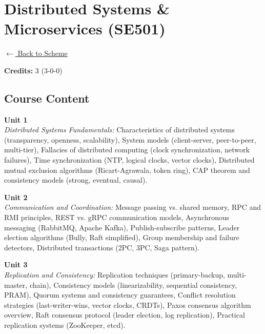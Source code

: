\section*{Distributed Systems \& Microservices (SE501)}
\label{major:SE_5}

\noindent \small{\hyperref[main:scheme]{$\leftarrow$ Back to Scheme}} \vspace{0.5cm}

\noindent \textbf{Credits:} 3 (3-0-0)

\subsection*{Course Content}
\noindent\textbf{Unit 1} \\
\textit{Distributed Systems Fundamentals:} Characteristics of distributed systems (transparency, openness, scalability), System models (client-server, peer-to-peer, multi-tier), Fallacies of distributed computing (clock synchronization, network failures), Time synchronization (NTP, logical clocks, vector clocks), Distributed mutual exclusion algorithms (Ricart-Agrawala, token ring), CAP theorem and consistency models (strong, eventual, causal).

\vspace{0.3cm}

\noindent\textbf{Unit 2} \\
\textit{Communication and Coordination:} Message passing vs. shared memory, RPC and RMI principles, REST vs. gRPC communication models, Asynchronous messaging (RabbitMQ, Apache Kafka), Publish-subscribe patterns, Leader election algorithms (Bully, Raft simplified), Group membership and failure detectors, Distributed transactions (2PC, 3PC, Saga pattern).

\vspace{0.3cm}

\noindent\textbf{Unit 3} \\
\textit{Replication and Consistency:} Replication techniques (primary-backup, multi-master, chain), Consistency models (linearizability, sequential consistency, PRAM), Quorum systems and consistency guarantees, Conflict resolution strategies (last-writer-wins, vector clocks, CRDTs), Paxos consensus algorithm overview, Raft consensus protocol (leader election, log replication), Practical replication systems (ZooKeeper, etcd).

\vspace{0.3cm}

